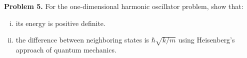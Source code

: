 \documentclass{article}
\begin{document}
\hrulefill

\textbf{Problem 5.} For the one-dimensional harmonic oscillator problem, show that:
\begin{enumerate}[(i)]
     \item its energy is positive definite.
     \item the difference between neighboring states is $\hbar\sqrt{k/m}$ using Heisenberg's approach of quantum mechanics.
 \end{enumerate} 
\end{document}
